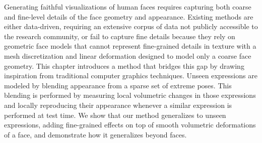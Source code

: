 Generating faithful visualizations of human faces requires capturing both
coarse and fine-level details of the face geometry and appearance.
Existing methods are either data-driven, requiring an extensive corpus of data
not publicly accessible to the research community, or fail to capture fine
details because they rely on geometric face models that cannot represent
fine-grained details in texture with a mesh discretization and linear
deformation designed to model only a coarse face geometry.
This chapter introduces a method that bridges this gap by drawing inspiration
from traditional computer graphics techniques.
Unseen expressions are modeled by blending appearance from a sparse set of
extreme poses.
This blending is performed by measuring local volumetric changes in those
expressions and locally reproducing their appearance whenever a similar
expression is performed at test time.
We show that our method generalizes to unseen expressions, adding fine-grained
effects on top of smooth volumetric deformations of a face, and demonstrate
how it generalizes beyond faces.
